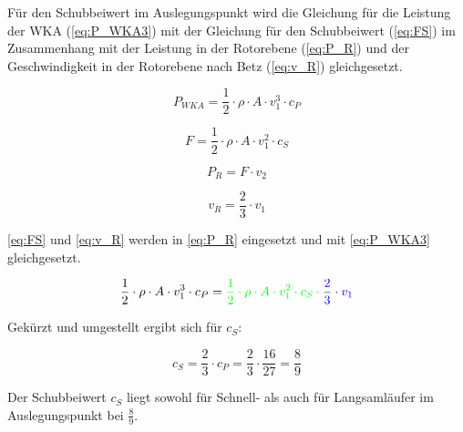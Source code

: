 Für den Schubbeiwert im Auslegungspunkt wird die Gleichung für die Leistung der WKA (\autoref{eq:P_WKA3}) mit der Gleichung für den Schubbeiwert (\autoref{eq:FS}) im Zusammenhang mit der Leistung in der Rotorebene (\autoref{eq:P_R})  und der Geschwindigkeit in der Rotorebene nach Betz (\autoref{eq:v_R}) gleichgesetzt. 

\begin{equation}
P_{WKA}= \frac{1}{2} \cdot \rho \cdot A \cdot v_1^3  \cdot c_P
\label{eq:P_WKA3} 
\end{equation}

\color{green}{}
\begin{equation}
F= \frac{1}{2} \cdot \rho \cdot A \cdot v_1^2  \cdot c_S
\label{eq:FS} 
\end{equation}
\color{black}{}


\begin{equation}
P_R= F \cdot v_2 
\label{eq:P_R} 
\end{equation}

\color{blue}{}
\begin{equation}
v_R= \frac{2}{3} \cdot v_1
\label{eq:v_R} 
\end{equation}
\color{black}{}


\autoref{eq:FS} und \autoref{eq:v_R} werden in \autoref{eq:P_R} eingesetzt und mit \autoref{eq:P_WKA3} gleichgesetzt. 

\begin{equation}
\frac{1}{2} \cdot \rho \cdot A \cdot v_1^3 \cdot c_P = \color{green}{}\frac{1}{2} \cdot \rho \cdot A \cdot v_1^2  \cdot c_S \cdot \color{blue}{}\frac{2}{3} \cdot v_1 \color{black}{}
\label{eq:c_s1} 
\end{equation}

Gekürzt und umgestellt ergibt sich für $c_S$:

$$c_S= \frac{2}{3} \cdot c_P = \frac{2}{3} \cdot \frac{16}{27} = \frac{8}{9}$$


Der Schubbeiwert $c_S$ liegt sowohl für Schnell- als auch für Langsamläufer im Auslegungspunkt bei $\frac{8}{9}$.

\label{sec:Vorbereitungsfragen}
